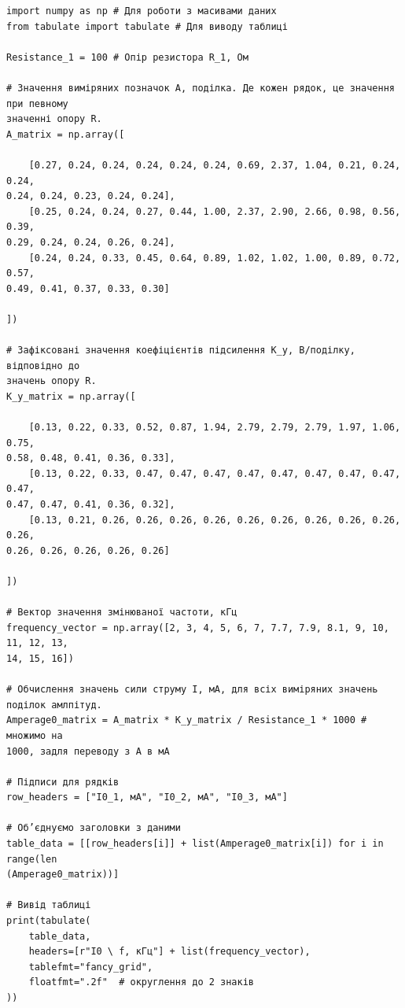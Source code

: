 \documentclass[12pt,a4paper]{article}
\begin{document}
    \small{ 

    \begin{verbatim}
import numpy as np # Для роботи з масивами даних
from tabulate import tabulate # Для виводу таблиці

Resistance_1 = 100 # Опір резистора R_1, Ом

# Значення виміряних позначок A, поділка. Де кожен рядок, це значення при певному
значенні опору R.
A_matrix = np.array([

    [0.27, 0.24, 0.24, 0.24, 0.24, 0.24, 0.69, 2.37, 1.04, 0.21, 0.24, 0.24,
0.24, 0.24, 0.23, 0.24, 0.24],
    [0.25, 0.24, 0.24, 0.27, 0.44, 1.00, 2.37, 2.90, 2.66, 0.98, 0.56, 0.39,
0.29, 0.24, 0.24, 0.26, 0.24],
    [0.24, 0.24, 0.33, 0.45, 0.64, 0.89, 1.02, 1.02, 1.00, 0.89, 0.72, 0.57,
0.49, 0.41, 0.37, 0.33, 0.30]

])

# Зафіксовані значення коефіцієнтів підсилення K_y, В/поділку, відповідно до
значень опору R.
K_y_matrix = np.array([

    [0.13, 0.22, 0.33, 0.52, 0.87, 1.94, 2.79, 2.79, 2.79, 1.97, 1.06, 0.75,
0.58, 0.48, 0.41, 0.36, 0.33],
    [0.13, 0.22, 0.33, 0.47, 0.47, 0.47, 0.47, 0.47, 0.47, 0.47, 0.47, 0.47,
0.47, 0.47, 0.41, 0.36, 0.32],
    [0.13, 0.21, 0.26, 0.26, 0.26, 0.26, 0.26, 0.26, 0.26, 0.26, 0.26, 0.26,
0.26, 0.26, 0.26, 0.26, 0.26]

])

# Вектор значення змінюваної частоти, кГц
frequency_vector = np.array([2, 3, 4, 5, 6, 7, 7.7, 7.9, 8.1, 9, 10, 11, 12, 13,
14, 15, 16])

# Обчислення значень сили струму I, мА, для всіх виміряних значень поділок амлпітуд.
Amperage0_matrix = A_matrix * K_y_matrix / Resistance_1 * 1000 # множимо на
1000, задля переводу з А в мА

# Підписи для рядків
row_headers = ["I0_1, мА", "I0_2, мА", "I0_3, мА"]

# Об’єднуємо заголовки з даними
table_data = [[row_headers[i]] + list(Amperage0_matrix[i]) for i in range(len
(Amperage0_matrix))]

# Вивід таблиці
print(tabulate(
    table_data,
    headers=[r"I0 \ f, кГц"] + list(frequency_vector),
    tablefmt="fancy_grid",
    floatfmt=".2f"  # округлення до 2 знаків
))
\end{verbatim}
}

    \vspace{3em}

    \hypertarget{listing2}{}
\end{document}
